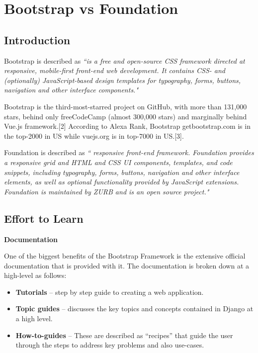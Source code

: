 \documentclass{article}
\begin{document}
\section{Bootstrap vs Foundation}

\subsection{Introduction}

Bootstrap is described as 
\textit{``is a free and open-source CSS framework directed at responsive, mobile-first front-end web development. It contains CSS- and (optionally) JavaScript-based design templates for typography, forms, buttons, navigation and other interface components."}

Bootstrap is the third-most-starred project on GitHub, with more than 131,000 stars, behind only freeCodeCamp (almost 300,000 stars) and marginally behind Vue.js framework.[2] According to Alexa Rank, Bootstrap getbootstrap.com is in the top-2000 in US while vuejs.org is in top-7000 in US.[3].

Foundation is described as 
\textit{``  responsive front-end framework. Foundation provides a responsive grid and HTML and CSS UI components, templates, and code snippets, including typography, forms, buttons, navigation and other interface elements, as well as optional functionality provided by JavaScript extensions. Foundation is maintained by ZURB and is an open source project."} \cite{djangohome}

\subsection{Effort to Learn}

\textbf{Documentation}

One of the biggest benefits of the Bootstrap Framework is the extensive official documentation that is provided with it. \cite{djangodoc} The documentation is broken down at a high-level as follows: 

\begin{itemize}
    \item \textbf{Tutorials} – step by step guide to creating a web application.
    \item \textbf{Topic guides} – discusses the key topics and concepts contained in Django at a high level.
    \item \textbf{How-to-guides} – These are described as ``recipes” that guide the user through the steps to address key problems and also use-cases.
\end{itemize}
\end{document}
